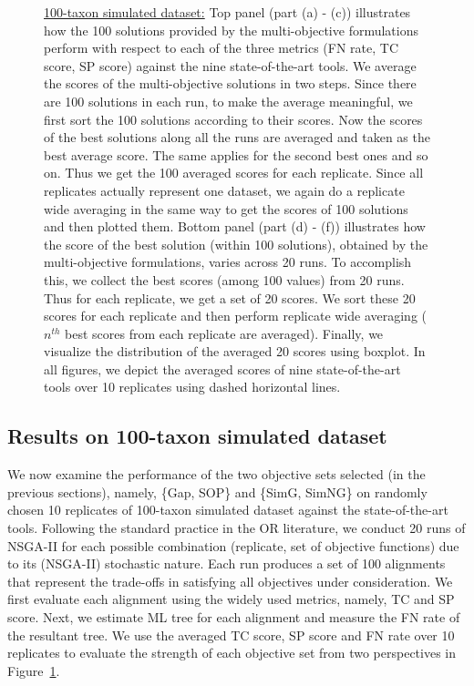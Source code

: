 \begin{figure}[!htbp]
\begin{adjustwidth}{-1.5cm}{-1.5cm}
	\caption{\underline{100-taxon simulated dataset:} Top panel (part (a) - (c)) illustrates how the 100 solutions provided by the multi-objective formulations perform with respect to each of the three metrics (FN rate, TC score, SP score) against the nine state-of-the-art tools. We average the scores of the multi-objective solutions in two steps. Since there are 100 solutions in each run, to make the average meaningful, we first sort the 100 solutions according to their scores. Now the scores of the best solutions along all the runs are averaged and taken as the best average score. The same applies for the second best ones and so on. Thus we get the 100 averaged scores for each replicate. Since all replicates actually represent one dataset, we again do a replicate wide averaging in the same way to get the scores of 100 solutions and then plotted them. Bottom panel (part (d) - (f)) illustrates how the score of the best solution (within 100 solutions), obtained by the multi-objective formulations, varies across 20 runs. To accomplish this, we collect the best scores (among 100 values) from 20 runs. Thus for each replicate, we get a set of 20 scores. We sort these 20 scores for each replicate and then perform replicate wide averaging ($n^{th}$ best scores from each replicate are averaged). Finally, we visualize the distribution of the averaged 20 scores using boxplot. In all figures, we depict the averaged scores of nine state-of-the-art tools over 10 replicates using dashed horizontal lines.}
	\label{fig:perf_100_taxon}
	\end{adjustwidth}
\end{figure}


\subsection{Results on 100-taxon simulated dataset}
\label{sec:result_100_taxon}
We now examine the performance of the two objective sets selected (in the previous sections), namely, \{Gap, SOP\} and \{SimG, SimNG\} on randomly chosen 10 replicates of 100-taxon simulated dataset against the state-of-the-art tools. Following the standard practice in the OR literature, we conduct 20 runs of NSGA-II for each possible combination (replicate, set of objective functions) due to its (NSGA-II) stochastic nature. Each run produces a set of 100 alignments that represent the trade-offs in satisfying all objectives under consideration. We first evaluate each alignment using the widely used metrics, namely, TC and SP score. Next, we estimate ML tree for each alignment and measure the FN rate of the resultant tree. We use the averaged TC score, SP score and FN rate over 10 replicates to evaluate the strength of each objective set from two perspectives in Figure~\ref{fig:perf_100_taxon}. %


